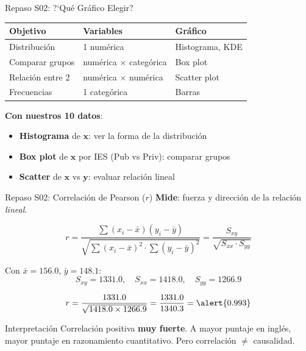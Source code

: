 \documentclass[aspectratio=169, 11pt]{beamer}
\begin{document}

\begin{frame}{Repaso S02: ?`Qu\'e Gr\'afico Elegir?}
\begin{table}
\centering
\small
\begin{tabular}{lll}
\toprule
\textbf{Objetivo} & \textbf{Variables} & \textbf{Gr\'afico} \\
\midrule
Distribuci\'on & 1 num\'erica & Histograma, KDE \\
Comparar grupos & num\'erica $\times$ categ\'orica & Box plot \\
Relaci\'on entre 2 & num\'erica $\times$ num\'erica & Scatter plot \\
Frecuencias & 1 categ\'orica & Barras \\
\bottomrule
\end{tabular}
\end{table}

\vspace{0.3cm}
\textbf{Con nuestros 10 datos}:
\begin{itemize}
  \item \textbf{Histograma} de $\mathbf{x}$: ver la forma de la distribuci\'on
  \item \textbf{Box plot} de $\mathbf{x}$ por IES (Pub vs Priv): comparar grupos
  \item \textbf{Scatter} de $\mathbf{x}$ vs $\mathbf{y}$: evaluar relaci\'on lineal
\end{itemize}
\end{frame}

\begin{frame}{Repaso S02: Correlaci\'on de Pearson ($r$)}
\textbf{Mide}: fuerza y direcci\'on de la relaci\'on \emph{lineal}.

\[
r = \frac{\sum(x_i - \bar{x})(y_i - \bar{y})}{\sqrt{\sum(x_i - \bar{x})^2 \cdot \sum(y_i - \bar{y})^2}}
= \frac{S_{xy}}{\sqrt{S_{xx} \cdot S_{yy}}}
\]

\vspace{0.2cm}
Con $\bar{x} = 156.0$, $\bar{y} = 148.1$:
\[
S_{xy} = 1331.0, \quad S_{xx} = 1418.0, \quad S_{yy} = 1266.9
\]

\[
r = \frac{1331.0}{\sqrt{1418.0 \times 1266.9}} = \frac{1331.0}{1340.3} = \alert{0.993}
\]

\vspace{0.2cm}
\begin{alertblock}{Interpretaci\'on}
Correlaci\'on positiva \textbf{muy fuerte}. A mayor puntaje en ingl\'es, mayor puntaje en razonamiento cuantitativo. Pero \alert{correlaci\'on $\neq$ causalidad}.
\end{alertblock}
\end{frame}
\end{document}
